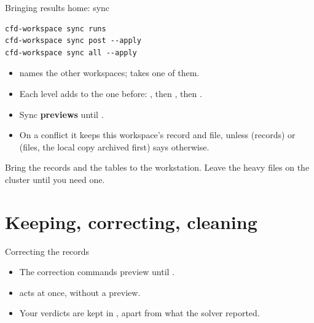 \begin{frame}[fragile]{Bringing results home: sync}
\begin{lstlisting}
cfd-workspace sync runs
cfd-workspace sync post --apply
cfd-workspace sync all --apply
\end{lstlisting}
\begin{itemize}
  \item {} names the other workspaces;
         takes one of them.
  \item Each level adds to the one before: , then ,
        then .
  \item Sync \textbf{previews} until .
  \item On a conflict it keeps this workspace's record and file, unless
         (records) or  (files, the
        local copy archived first) says otherwise.
\end{itemize}
\begin{takeaway}Bring the records and the tables to the workstation. Leave
the heavy files on the cluster until you need one.\end{takeaway}
\end{frame}

\section{Keeping, correcting, cleaning}

\begin{frame}{Correcting the records}
\vspace{2mm}
\begin{itemize}\small
  \item The correction commands preview until .
  \item {} acts at once, without a preview.
  \item Your verdicts are kept in , apart from what the
        solver reported.
\end{itemize}
\end{frame}

